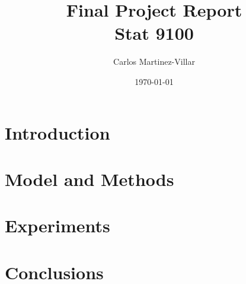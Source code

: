 \documentclass{article}
\title{Final Project Report\\Stat 9100}
\author{Carlos Martinez-Villar}
\date{\today}
\begin{document}
	\maketitle
	\section{Introduction}
	\section{Model and Methods}
	\section{Experiments}
	\section{Conclusions}
\end{document}
